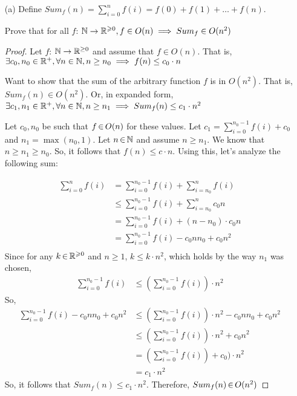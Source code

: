 \documentclass[12pt, a4paper]{amsart}
\theoremstyle{definition}
\theoremstyle{remark}
\numberwithin{Theorem}{section}
\begin{document}
\begin{enumerate}
    
    \item[(a)] Define $Sum_f(n) = \sum_{i = 0}^{n} f(i) = f(0) + f(1) + \dots + f(n)$.
    
    Prove that for all $f$: $\mathbb N \rightarrow \mathbb R^{\geqslant 0}, f \in O(n) \implies Sum_f \in O(n^2)$
    
    \begin{proof}
    
    Let $f$: $\mathbb N \rightarrow \mathbb R^{\geq 0}$ and 
    assume that $f \in O(n)$. That is, \\
    $\exists c_0, n_0 \in \mathbb R^{+}, \forall n \in \mathbb N, n \geq n_0 \implies f(n) \leq c_0 \cdot n$
    
    Want to show that the sum of the arbitrary function $f$ is in $O(n^2)$. That is,
    $Sum_f (n) \in O(n^2)$. Or, in expanded form, \\
    $\exists c_1, n_1 \in \mathbb R^{+}, \forall n \in \mathbb N, n \geq n_1 \implies Sum_f(n) \leq c_1 \cdot n^2$
    
    \medbreak
    
    Let $c_0, n_0$ be such that $f \,{\in}\, O(n)$ for these values. Let $c_1 = \sum_{i = 0}^{n_0 - 1} f(i) + c_0$ and $n_1 = \max(n_0, 1)$. Let $n \,{\in}\, \mathbb N$ and assume $n \geqslant n_1$.
    We know that $n \geq n_1 \geq n_0$. So, it follows that $f(n) \leq c \cdot n$. Using this, let's analyze the following sum:
    
    \begin{align*}
        \sum_{i = 0}^{n} f(i) &= \sum_{i = 0}^{n_0 - 1} f(i) + \sum_{i =  n_0}^{n} f(i) \\
        &\leq \sum_{i = 0}^{n_0 - 1} f(i) + \sum_{i =  n_0}^{n} c_0n\tag{$\forall n \geq n_0, f(n) \leq c_0n$} \\
        &= \sum_{i = 0}^{n_0 - 1} f(i) + (n-n_0) \cdot c_0n \\
        &= \sum_{i = 0}^{n_0 - 1} f(i) - c_0nn_0 + c_0n^2 \\
    \end{align*}
    Since for any $k \,{\in}\, \mathbb R^{\geqslant 0}$ and $n \geq 1$, $k \leq k \cdot n^2$, which holds by the way $n_1$ was chosen, 
    \begin{align*}
         \sum_{i = 0}^{n_0 - 1} f(i) &\leq (\sum_{i = 0}^{n_0 - 1} f(i)) \cdot n^2 \tag{Because $f(n) \geq 0$}
    \end{align*}
    So,
    \begin{align*}
        \sum_{i = 0}^{n_0 - 1} f(i) - c_0nn_0 + c_0n^2 &\leq (\sum_{i = 0}^{n_0 - 1} f(i)) \cdot n^2 - c_0nn_0 + c_0n^2 \\
        &\leq (\sum_{i = 0}^{n_0 - 1} f(i)) \cdot n^2 + c_0n^2 \tag{since $-c_0nn_0 \leq 0$} \\
        &= (\sum_{i = 0}^{n_0 - 1} f(i)) + c_0) \cdot n^2 \\
        &= c_1 \cdot n^2
    \end{align*}
    So, it follows that $Sum_f(n) \leq c_1 \cdot n^2$. Therefore, $Sum_f(n) \,{\in}\, O(n^2)$
   

\end{proof}
\end{enumerate}
\end{document}
